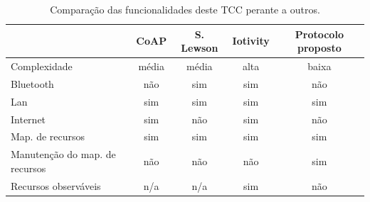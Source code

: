 \begin{table}[htb!]
    \centering
    \caption{Comparação das funcionalidades deste TCC perante a outros.}
    \begin{tabular}{|l|c|c|c|c|}
    \hline
                                   & CoAP  & S. Lewson & Iotivity & Protocolo proposto \\ \hline
    Complexidade                   & média & média     & alta     & baixa              \\ \hline
    Bluetooth                      & não   & sim       & sim      & não                \\ \hline
    Lan                            & sim   & sim       & sim      & sim                \\ \hline
    Internet                       & sim   & não       & sim      & não                \\ \hline
    Map. de recursos               & sim   & sim       & sim      & sim                \\ \hline
    Manutenção do map. de recursos & não   & não       & não      & sim                \\ \hline
    Recursos observáveis           & n/a   & n/a       & sim      & não                \\ \hline
    \end{tabular}
    \label{table:tab1}
\end{table}




